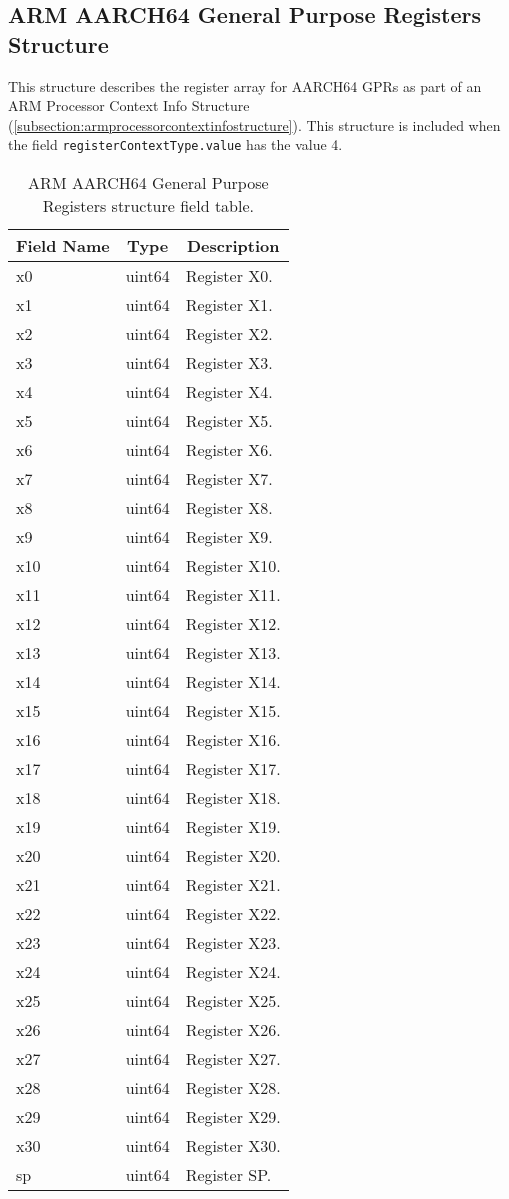 \documentclass{report}
\newcommand*{\thead}[1]{\multicolumn{1}{|c|}{\bfseries #1}}
\newcommand*{\jsontable}[1]{
    \begin{table}[!ht]
    \label{#1}
    \centering
    \begin{adjustbox}{center}
    \begin{tabular}{|l|c|p{8cm}|}
    \hline
    \thead{Field Name} & \thead{Type} & \thead{Description} \\
    \hline
}
\newcommand*{\jsontableend}[1]{
    \hline
    \end{tabular}
    \end{adjustbox}
    \caption{#1}
    \label{table:#1}
    \end{table}
    \FloatBarrier
}
\begin{document}
\subsection{ARM AARCH64 General Purpose Registers Structure}
\label{subsection:armaarch64gprstructure}
This structure describes the register array for AARCH64 GPRs as part of an ARM Processor Context Info Structure (\ref{subsection:armprocessorcontextinfostructure}). This structure is included when the field \texttt{registerContextType.value} has the value 4.
\jsontable{table:armaarch64gprstructure}
x0 & uint64 & Register X0.\\
\hline
x1 & uint64 & Register X1.\\
\hline
x2 & uint64 & Register X2.\\
\hline
x3 & uint64 & Register X3.\\
\hline
x4 & uint64 & Register X4.\\
\hline
x5 & uint64 & Register X5.\\
\hline
x6 & uint64 & Register X6.\\
\hline
x7 & uint64 & Register X7.\\
\hline
x8 & uint64 & Register X8.\\
\hline
x9 & uint64 & Register X9.\\
\hline
x10 & uint64 & Register X10.\\
\hline
x11 & uint64 & Register X11.\\
\hline
x12 & uint64 & Register X12.\\
\hline
x13 & uint64 & Register X13.\\
\hline
x14 & uint64 & Register X14.\\
\hline
x15 & uint64 & Register X15.\\
\hline
x16 & uint64 & Register X16.\\
\hline
x17 & uint64 & Register X17.\\
\hline
x18 & uint64 & Register X18.\\
\hline
x19 & uint64 & Register X19.\\
\hline
x20 & uint64 & Register X20.\\
\hline
x21 & uint64 & Register X21.\\
\hline
x22 & uint64 & Register X22.\\
\hline
x23 & uint64 & Register X23.\\
\hline
x24 & uint64 & Register X24.\\
\hline
x25 & uint64 & Register X25.\\
\hline
x26 & uint64 & Register X26.\\
\hline
x27 & uint64 & Register X27.\\
\hline
x28 & uint64 & Register X28.\\
\hline
x29 & uint64 & Register X29.\\
\hline
x30 & uint64 & Register X30.\\
\hline
sp & uint64 & Register SP.\\
\jsontableend{ARM AARCH64 General Purpose Registers structure field table.}
\end{document}
